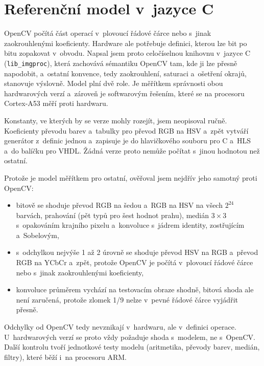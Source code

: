 \documentclass[FM,DP]{tulthesis}
\begin{document}
\section{Referenční model v~jazyce C}
\label{sec:model}

OpenCV počítá část operací v~plovoucí řádové čárce nebo s~jinak zaokrouhlenými
koeficienty. Hardware ale potřebuje definici, kterou lze bit po bitu zopakovat
v~obvodu. Napsal jsem proto celočíselnou knihovnu v~jazyce C
(\texttt{lib\_imgproc}), která zachovává sémantiku OpenCV tam, kde ji lze
přesně napodobit, a~ostatní konvence, tedy zaokrouhlení, saturaci a~ošetření
okrajů, stanovuje výslovně. Model plní dvě role. Je měřítkem správnosti obou
hardwarových verzí a~zároveň je softwarovým řešením, které se na procesoru
Cortex-A53 měří proti hardwaru.

Konstanty, ve kterých by se verze mohly rozejít, jsem neopisoval ručně.
Koeficienty převodu barev a~tabulky pro převod RGB na HSV a~zpět vytváří
generátor z~definic jednou a~zapisuje je do hlavičkového souboru pro C a~HLS
a~do balíčku pro VHDL. Žádná verze proto nemůže počítat s~jinou hodnotou než
ostatní.

Protože je model měřítkem pro ostatní, ověřoval jsem nejdřív jeho samotný proti
OpenCV:
\begin{itemize}
    \item bitově se shoduje převod RGB na šedou a~RGB na HSV na všech $2^{24}$ barvách,
          prahování (pět typů pro šest hodnot prahu), medián 3\,×\,3 s~opakováním
          krajního pixelu a~konvoluce s~jádrem identity, zostřujícím a~Sobelovým,
    \item s~odchylkou nejvýše 1 až 2 úrovně se shoduje převod HSV na RGB a~převod RGB na
          YCbCr a~zpět, protože OpenCV je počítá v~plovoucí řádové čárce nebo s~jinak
          zaokrouhlenými koeficienty,
    \item konvoluce průměrem vychází na testovacím obraze shodně, bitová shoda ale není
          zaručená, protože zlomek 1/9 nelze v~pevné řádové čárce vyjádřit přesně.
\end{itemize}
Odchylky od OpenCV tedy nevznikají v~hardwaru, ale v~definici operace. U~hardwarových verzí se proto vždy požaduje shoda s~modelem, ne s~OpenCV. Další kontrolu tvoří jednotkové testy modelu (aritmetika, převody barev, medián, filtry), které běží i~na procesoru ARM.
\end{document}
